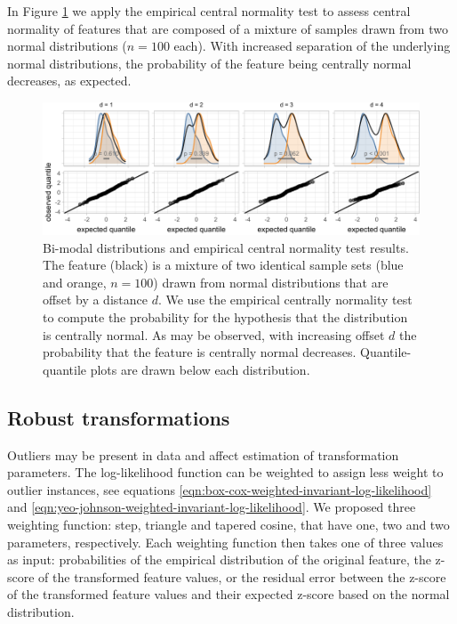 \documentclass[
  a4paper,
]{article}
\begin{document}
In Figure \ref{fig:empirical-central-normality-examples} we apply the
empirical central normality test to assess central normality of features
that are composed of a mixture of samples drawn from two normal
distributions (\(n = 100\) each). With increased separation of the
underlying normal distributions, the probability of the feature being
centrally normal decreases, as expected.

\begin{figure}

{\centering \includegraphics{manuscript_files/figure-latex/empirical-central-normality-examples-1} 

}

\caption{Bi-modal distributions and empirical central normality test results. The feature (black) is a mixture of two identical sample sets (blue and orange, $n = 100$) drawn from normal distributions that are offset by a distance $d$. We use the empirical centrally normality test to compute the probability for the hypothesis that the distribution is centrally normal. As may be observed, with increasing offset $d$ the probability that the feature is centrally normal decreases. Quantile-quantile plots are drawn below each distribution.}\label{fig:empirical-central-normality-examples}
\end{figure}

\subsection{Robust transformations}\label{robust-transformations}

Outliers may be present in data and affect estimation of transformation
parameters. The log-likelihood function can be weighted to assign less
weight to outlier instances, see equations
\ref{eqn:box-cox-weighted-invariant-log-likelihood} and
\ref{eqn:yeo-johnson-weighted-invariant-log-likelihood}. We proposed
three weighting function: step, triangle and tapered cosine, that have
one, two and two parameters, respectively. Each weighting function then
takes one of three values as input: probabilities of the empirical
distribution of the original feature, the z-score of the transformed
feature values, or the residual error between the z-score of the
transformed feature values and their expected z-score based on the
normal distribution.
\end{document}
